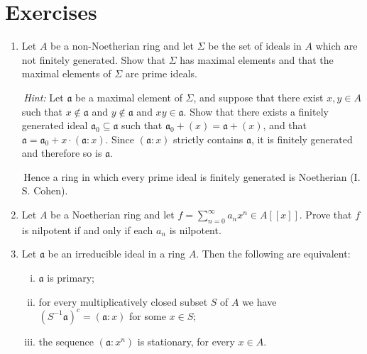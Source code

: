 \section*{Exercises}

\begin{enumerate}
    \item \label{exer1-chapter7}Let $A$ be a non-Noetherian ring and let $\Sigma$ be the set of ideals in $A$ which are not finitely generated. Show that $\Sigma$ has maximal elements and that the maximal elements of $\Sigma$ are prime ideals.
    
    \quad\,\textit{Hint:} Let $\mathfrak{a}$ be a maximal element of $\Sigma$, and suppose that there exist $x, y \in A$ such that $x \notin \mathfrak{a}$ and $y \notin \mathfrak{a}$ and $xy \in \mathfrak{a}$. Show that there exists a finitely generated ideal $\mathfrak{a}_0 \subseteq \mathfrak{a}$ such that $\mathfrak{a}_0 + (x) = \mathfrak{a} + (x)$, and that $\mathfrak{a} = \mathfrak{a}_0 + x \cdot (\mathfrak{a}:x)$. Since $(\mathfrak{a}:x)$ strictly contains $\mathfrak{a}$, it is finitely generated and therefore so is $\mathfrak{a}$.

    \quad\,Hence a ring in which every prime ideal is finitely generated is Noetherian (I. S. Cohen).

    \item \label{exer2-chapter7}Let $A$ be a Noetherian ring and let $f = \sum_{n=0}^\infty a_n x^n \in A[[x]]$. Prove that $f$ is nilpotent if and only if each $a_n$ is nilpotent.

    \item \label{exer3-chapter7}Let $\mathfrak{a}$ be an irreducible ideal in a ring $A$. Then the following are equivalent:
    \begin{enumerate}[i)]
        \item $\mathfrak{a}$ is primary;
        \item for every multiplicatively closed subset $S$ of $A$ we have $(S^{-1}\mathfrak{a})^c = (\mathfrak{a}:x)$ for some $x \in S$;
        \item the sequence $(\mathfrak{a}:x^n)$ is stationary, for every $x \in A$.
    \end{enumerate}


\end{enumerate}
